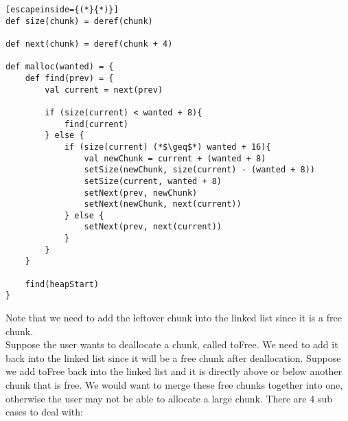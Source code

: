 \documentclass[12pt, letterpaper]{article}
\begin{document}
\begin{lstlisting}[escapeinside={(*}{*)}]
def size(chunk) = deref(chunk)

def next(chunk) = deref(chunk + 4)

def malloc(wanted) = {
	def find(prev) = {
		val current = next(prev)
		
		if (size(current) < wanted + 8){
			find(current)
		} else {
			if (size(current) (*$\geq$*) wanted + 16){
				val newChunk = current + (wanted + 8)
				setSize(newChunk, size(current) - (wanted + 8))
				setSize(current, wanted + 8)
				setNext(prev, newChunk)
				setNext(newChunk, next(current))
			} else {
				setNext(prev, next(current))
			}
		}
	}
	
	find(heapStart)
}
\end{lstlisting}
Note that we need to add the leftover chunk into the linked list since it is a free chunk.\\

Suppose the user wants to deallocate a chunk, called toFree. We need to add it back into the linked list since it will be a free chunk after deallocation. Suppose we add toFree back into the linked list and it is directly above or below another chunk that is free. We would want to merge these free chunks together into one, otherwise the user may not be able to allocate a large chunk. There are 4 sub cases to deal with:\\
\end{document}
